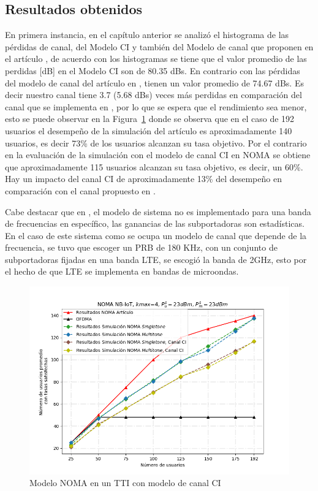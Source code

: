 \subsection{Resultados obtenidos}
En primera instancia, en el capítulo anterior se analizó el histograma de las pérdidas de canal, del Modelo CI y también del Modelo de canal que proponen en el artículo \parencite{Shahini2019} , de acuerdo con los histogramas se tiene que el valor promedio de las perdidas [dB] en el Modelo CI son de 80.35 dBs. En contrario con las pérdidas del modelo de canal del artículo en \parencite{Shahini2019}, tienen un valor promedio de 74.67 dBs. Es decir nuestro canal tiene 3.7 (5.68 dBs) veces más perdidas en comparación del canal que se implementa en \parencite{Shahini2019}, por lo que se espera que el rendimiento sea menor, esto se puede observar en la Figura~\ref{fig:NOMA_comprobacion_CI} donde se observa que en el caso de 192 usuarios el desempeño de la simulación del artículo es aproximadamente 140 usuarios, es decir 73\% de los usuarios alcanzan su tasa objetivo. Por el contrario en la evaluación de la simulación con el modelo de canal CI en NOMA se obtiene que aproximadamente 115 usuarios alcanzan su tasa objetivo, es decir, un 60\%. Hay un impacto del canal CI de aproximadamente 13\% del desempeño en comparación con el canal propuesto en \parencite{Shahini2019}.\newline

Cabe destacar que en \parencite{Shahini2019}, el modelo de sistema no es implementado para una banda de frecuencias en específico, las ganancias de las subportadoras son estadísticas. En el caso de este sistema como se ocupa un modelo de canal que depende de la frecuencia, se tuvo que escoger un PRB de 180 KHz, con un conjunto de subportadoras fijadas en una banda LTE, se escogió la banda de 2GHz, esto por el hecho de que LTE se implementa en bandas de microondas. \newline

\begin{figure}[th]
    \centering
    \includegraphics[scale=.7]{Figures/ResultadosNOMA/NOMA_comprobacion_CI.png}
    \decoRule
    \caption[Modelo NOMA en un TTI con modelo de canal CI]{Modelo NOMA en un TTI con modelo de canal CI}
    \label{fig:NOMA_comprobacion_CI}
\end{figure}

